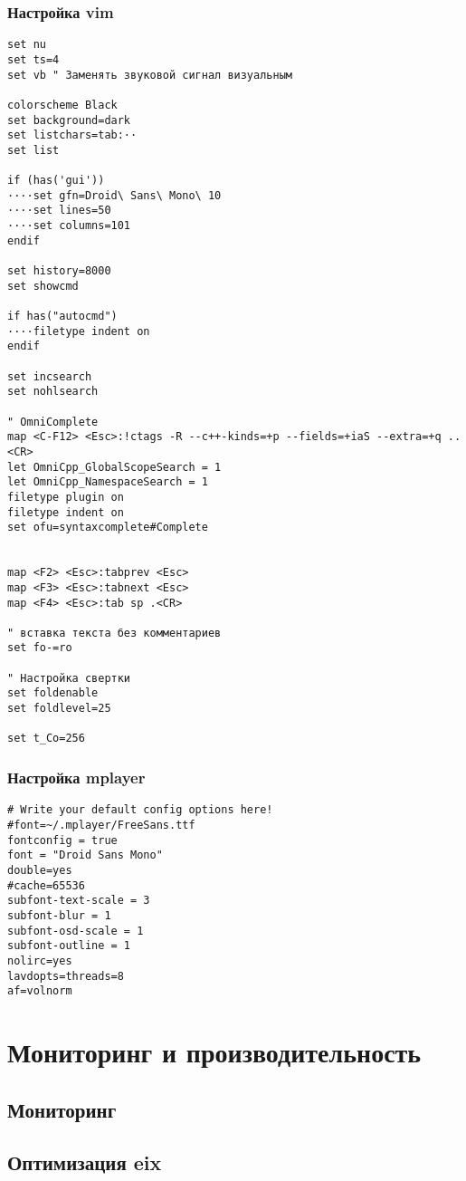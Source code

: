 \documentclass[12pt, a4paper]{article}
\begin{document}
\subsubsection{Настройка vim}
\begin{verbatim}
set nu 
set ts=4
set vb " Заменять звуковой сигнал визуальным

colorscheme Black
set background=dark
set listchars=tab:··
set list

if (has('gui'))
····set gfn=Droid\ Sans\ Mono\ 10 
····set lines=50
····set columns=101
endif

set history=8000
set showcmd

if has("autocmd")
····filetype indent on 
endif

set incsearch
set nohlsearch

" OmniComplete
map <C-F12> <Esc>:!ctags -R --c++-kinds=+p --fields=+iaS --extra=+q ..<CR>
let OmniCpp_GlobalScopeSearch = 1
let OmniCpp_NamespaceSearch = 1
filetype plugin on 
filetype indent on 
set ofu=syntaxcomplete#Complete


map <F2> <Esc>:tabprev <Esc>
map <F3> <Esc>:tabnext <Esc>
map <F4> <Esc>:tab sp .<CR>

" вставка текста без комментариев
set fo-=ro

" Настройка свертки
set foldenable
set foldlevel=25

set t_Co=256
\end{verbatim}


\subsubsection{Настройка mplayer}
\begin{verbatim}
# Write your default config options here!
#font=~/.mplayer/FreeSans.ttf
fontconfig = true
font = "Droid Sans Mono"
double=yes
#cache=65536
subfont-text-scale = 3
subfont-blur = 1
subfont-osd-scale = 1
subfont-outline = 1
nolirc=yes
lavdopts=threads=8
af=volnorm
\end{verbatim}

\newpage
\section{Мониторинг и производительность}

\subsection{Мониторинг}

\subsection{Оптимизация eix}
\end{document}
